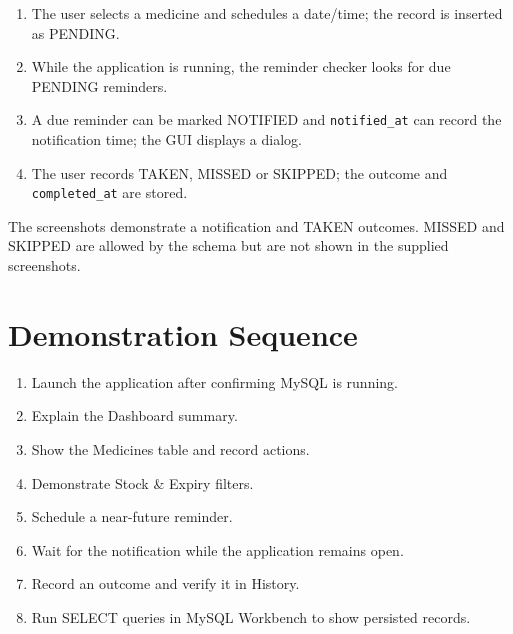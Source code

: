 \documentclass[12pt,a4paper,oneside]{report}
\begin{document}
\begin{enumerate}
\item The user selects a medicine and schedules a date/time; the record is inserted as PENDING.
\item While the application is running, the reminder checker looks for due PENDING reminders.
\item A due reminder can be marked NOTIFIED and \texttt{notified\_at} can record the notification time; the GUI displays a dialog.
\item The user records TAKEN, MISSED or SKIPPED; the outcome and \texttt{completed\_at} are stored.
\end{enumerate}
The screenshots demonstrate a notification and TAKEN outcomes. MISSED and SKIPPED are allowed by the schema but are not shown in the supplied screenshots.

\chapter{Demonstration Sequence}
\begin{enumerate}
\item Launch the application after confirming MySQL is running.
\item Explain the Dashboard summary.
\item Show the Medicines table and record actions.
\item Demonstrate Stock \& Expiry filters.
\item Schedule a near-future reminder.
\item Wait for the notification while the application remains open.
\item Record an outcome and verify it in History.
\item Run SELECT queries in MySQL Workbench to show persisted records.
\end{enumerate}
\end{document}
